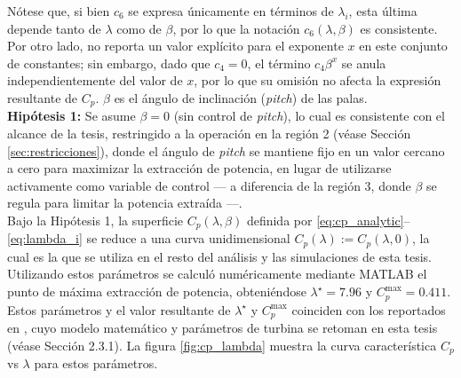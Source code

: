 Nótese que, si bien $c_6$ se expresa únicamente en términos de $\lambda_i$, esta última depende tanto de 
$\lambda$ como de $\beta$, por lo que la notación $c_6(\lambda,\beta)$ es consistente. Por otro lado, 
\cite{amlang1992} no reporta un valor explícito para el exponente $x$ en este conjunto de constantes; sin 
embargo, dado que $c_4 = 0$, el término $c_4\beta^x$ se anula independientemente del valor de $x$, por lo 
que su omisión no afecta la expresión resultante de $C_p$. $\beta$ es el ángulo de inclinación (\emph{pitch}) de las palas.
\\ 

\textbf{Hipótesis 1:} Se asume $\beta = 0$ (sin control de \textit{pitch}), lo cual
es consistente con el alcance de la tesis, restringido a la operación en la región 2
(véase Sección \ref{sec:restricciones}), donde el ángulo de \textit{pitch} se mantiene fijo en un valor
cercano a cero para maximizar la extracción de potencia, en lugar de utilizarse
activamente como variable de control --- a diferencia de la región 3, donde $\beta$
se regula para limitar la potencia extraída ---.
\\

Bajo la Hipótesis 1, la superficie $C_p(\lambda,\beta)$ definida por
\eqref{eq:cp_analytic}--\eqref{eq:lambda_i} se reduce a una curva unidimensional
$C_p(\lambda) := C_p(\lambda,0)$, la cual es la que se utiliza en el resto del
análisis y las simulaciones de esta tesis. Utilizando estos parámetros se calculó
numéricamente mediante MATLAB el punto de máxima extracción de potencia,
obteniéndose $\lambda^\star = 7.96$ y $C_p^{\text{max}} = 0.411$. Estos parámetros y el
valor resultante de $\lambda^\star$ y $C_p^{\text{max}}$ coinciden con los reportados en
\cite{cisneros2020}, cuyo modelo matemático y parámetros de turbina se retoman en
esta tesis (véase Sección 2.3.1). La figura \ref{fig:cp_lambda} muestra la curva
característica $C_p$ vs $\lambda$ para estos parámetros.



